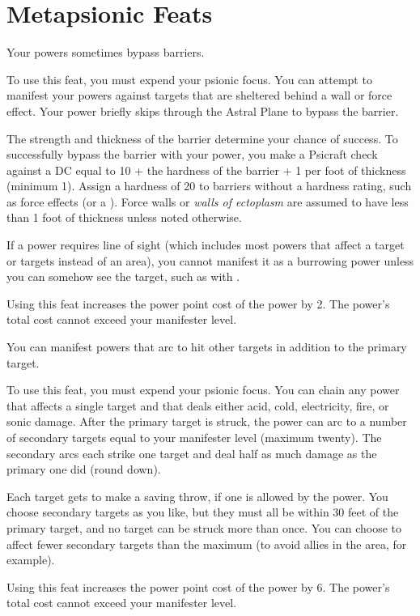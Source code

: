 \section{Metapsionic Feats}

{Your powers sometimes bypass barriers.}{}
{To use this feat, you must expend your psionic focus. You can attempt to manifest your powers against targets that are sheltered behind a wall or force effect. Your power briefly skips through the Astral Plane to bypass the barrier.

The strength and thickness of the barrier determine your chance of success. To successfully bypass the barrier with your power, you make a Psicraft check against a DC equal to 10 + the hardness of the barrier + 1 per foot of thickness (minimum 1). Assign a hardness of 20 to barriers without a hardness rating, such as force effects (or a ). Force walls or \emph{walls of ectoplasm} are assumed to have less than 1 foot of thickness unless noted otherwise.

If a power requires line of sight (which includes most powers that affect a target or targets instead of an area), you cannot manifest it as a burrowing power unless you can somehow see the target, such as with .

Using this feat increases the power point cost of the power by 2. The power’s total cost cannot exceed your manifester level.}{}{}

{You can manifest powers that arc to hit other targets in addition to the primary target.}
{}
{To use this feat, you must expend your psionic focus. You can chain any power that affects a single target and that deals either acid, cold, electricity, fire, or sonic damage. After the primary target is struck, the power can arc to a number of secondary targets equal to your manifester level (maximum twenty). The secondary arcs each strike one target and deal half as much damage as the primary one did (round down).

Each target gets to make a saving throw, if one is allowed by the power. You choose secondary targets as you like, but they must all be within 30 feet of the primary target, and no target can be struck more than once. You can choose to affect fewer secondary targets than the maximum (to avoid allies in the area, for example).

Using this feat increases the power point cost of the power by 6. The power’s total cost cannot exceed your manifester level.}{}{}

